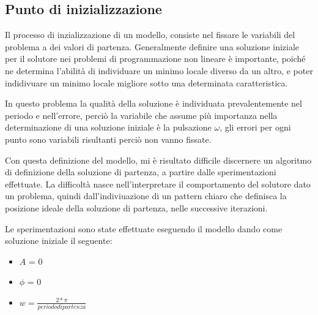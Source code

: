 \documentclass[a4paper,12pt]{report}
\begin{document}
\subsection{Punto di inizializzazione}
Il processo di inzializzazione di un modello, consiste nel fissare le variabili del problema a dei valori di partenza. Generalmente definire una soluzione iniziale per il solutore nei problemi di programmazione non lineare è importante, poiché ne determina l'abilità di individuare un minimo locale diverso da un altro, e poter indidivuare un minimo locale migliore sotto una determinata caratteristica.

In questo problema la qualità della soluzione è individuata prevalentemente nel periodo e nell'errore, perciò la variabile che assume più importanza nella determinazione di una soluzione iniziale è la pulsazione $\omega$, gli errori per ogni punto sono variabili risultanti perciò non vanno fissate.

Con questa definizione del modello, mi è risultato difficile discernere un algoritmo di definizione della soluzione di partenza, a partire dalle sperimentazioni effettuate. La difficoltà nasce nell'interpretare il comportamento del solutore dato un problema, quindi dall'indiviuazione di un pattern chiaro che definisca la posizione ideale della soluzione di partenza, nelle successive iterazioni.

Le sperimentazioni sono state effettuate eseguendo il modello dando come soluzione iniziale il seguente:
\begin{itemize}
  \item $A$ = 0
  \item $\phi$ = 0
  \item $w = \frac{2*\pi}{periodo di partenza}$
\end{itemize}
\end{document}
